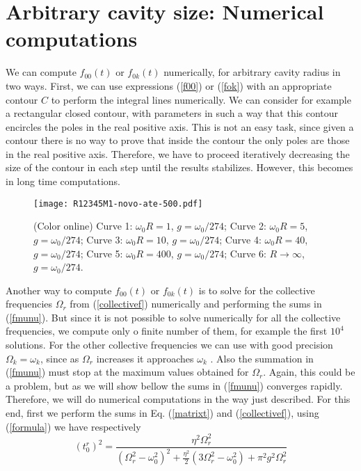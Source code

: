 \documentclass[10pt,english,twocolumn]{revtex4}
\begin{document}
\section{Arbitrary cavity size: Numerical computations}
We can compute $f_{00}(t)$ or $f_{0k}(t)$ numerically, for arbitrary cavity radius in two ways. First, we can use
expressions (\ref{f00}) or (\ref{fok})  with an appropriate contour $C$ to perform the integral lines
numerically. We can consider for example a rectangular closed contour, with parameters in such a way that this
contour encircles the poles in the real positive axis. This is not an easy task, since given a contour there is no way
to prove that inside the contour  the only poles are those in the real positive axis. Therefore, we have to  proceed iteratively
decreasing the size of the contour in each step until the results stabilizes. However, this becomes in long time computations. 
\begin{figure}[b!]
\texttt{[image: R12345M1-novo-ate-500.pdf]}
 \caption{(Color online) Curve 1: $\omega_0R=1$, $g=\omega_0/274$; Curve 2: $\omega_0R=5$, $g=\omega_0/274$; Curve 3: $\omega_0R=10$, $g=\omega_0/274$;
 Curve 4: $\omega_0R=40$, $g=\omega_0/274$; 
 Curve 5: $\omega_0R=400$, $g=\omega_0/274$; Curve 6: $R\rightarrow\infty$, $g=\omega_0/274$.  }
\label{fig5} 
\end{figure}
Another way to compute $f_{00}(t)$ or $f_{0k}(t)$ is to solve for the collective
frequencies $\Omega_r$ from (\ref{collectivef}) numerically and performing the sums in (\ref{fmunu}). But since
it is not possible to solve numerically for all the collective frequencies, we compute only o finite number of
them, for example the first $10^4$ solutions. For the other collective frequencies we can use with good precision $\Omega_k=\omega_k$,
since as $\Omega_r$ increases it approaches $\omega_k$ \cite{adolfo1}.
Also the summation in (\ref{fmunu}) must stop at the maximum values obtained for $\Omega_r$. Again, this could be a problem, 
but as we will show bellow the
sums in (\ref{fmunu}) converges rapidly. Therefore, we will do numerical computations in the way just
described. For this end, first we perform the sums in Eq. (\ref{matrixt}) and (\ref{collectivef}), using (\ref{formula}) we
have respectively
%
\begin{equation}
(t_0^r)^2=\frac{\eta^2\Omega_r^2}{(\Omega_r^2-\omega_0^2)^2+\frac{\eta^2}{2}(3\Omega_r^2-\omega_0^2)+
\pi^2 g^2\Omega_r^2}
\label{num1}
\end{equation}
\end{document}
